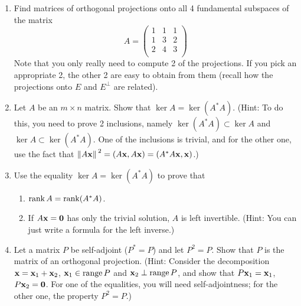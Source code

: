 \documentclass[../psets.tex]{subfiles}
\begin{document}
\begin{enumerate}[label={\textbf{5.\arabic*.}}]
    \item Find matrices of orthogonal projections onto all 4 fundamental subspaces of the matrix
    \begin{equation*}
        A =
        \begin{pmatrix}
            1 & 1 & 1\\
            1 & 3 & 2\\
            2 & 4 & 3\\
        \end{pmatrix}
    \end{equation*}
    Note that you only really need to compute 2 of the projections. If you pick an appropriate 2, the other 2 are easy to obtain from them (recall how the projections onto $E$ and $E^\perp$ are related).
    \item Let $A$ be an $m\times n$ matrix. Show that $\ker A=\ker(A^*A)$. (Hint: To do this, you need to prove 2 inclusions, namely $\ker(A^*A)\subset\ker A$ and $\ker A\subset\ker(A^*A)$. One of the inclusions is trivial, and for the other one, use the fact that $\norm*{A\mathbf{x}}^2=(A\mathbf{x},A\mathbf{x})=(A^*A\mathbf{x},\mathbf{x})$.)
    \item Use the equality $\ker A=\ker(A^*A)$ to prove that
    \begin{enumerate}
        \item $\rank A=\rank(A^*A)$.
        \item If $A\mathbf{x}=\bm{0}$ has only the trivial solution, $A$ is left invertible. (Hint: You can just write a formula for the left inverse.)
    \end{enumerate}
    \item Let a matrix $P$ be self-adjoint ($P^*=P$) and let $P^2=P$. Show that $P$ is the matrix of an orthogonal projection. (Hint: Consider the decomposition $\mathbf{x}=\mathbf{x}_1+\mathbf{x}_2$, $\mathbf{x}_1\in\operatorname{range} P$ and $\mathbf{x}_2\perp\operatorname{range} P$, and show that $P\mathbf{x}_1=\mathbf{x}_1$, $P\mathbf{x}_2=\bm{0}$. For one of the equalities, you will need self-adjointness; for the other one, the property $P^2=P$.)
\end{enumerate}
\end{document}
